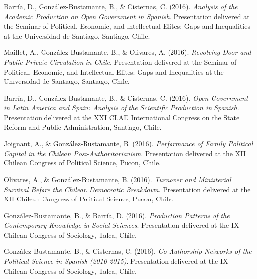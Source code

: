 \begin{publications}
\begin{benumerate}{66}
\item{\small Barría, D., González-Bustamante, B., \& Cisternas, C. (2016). {\itshape Analysis of the Academic Production on Open Government in Spanish}. Presentation delivered at the Seminar of Political, Economic, and Intellectual Elites: Gaps and Inequalities at the Universidad de Santiago, Santiago, Chile.}\vspace{1mm}

\item{\small Maillet, A., González-Bustamante, B., \& Olivares, A. (2016). {\itshape Revolving Door and Public-Private Circulation in Chile}. Presentation delivered at the Seminar of Political, Economic, and Intellectual Elites: Gaps and Inequalities at the Universidad de Santiago, Santiago, Chile.}\vspace{1mm}

\item{\small Barría, D., González-Bustamante, B., \& Cisternas, C. (2016). {\itshape Open Government in Latin America and Spain: Analysis of the Scientific Production in Spanish}. Presentation delivered at the XXI CLAD International Congress on the State Reform and Public Administration, Santiago, Chile.}\vspace{1mm}

\item{\small Joignant, A., \& González-Bustamante, B. (2016). {\itshape Performance of Family Political Capital in the Chilean Post-Authoritarianism}. Presentation delivered at the XII Chilean Congress of Political Science, Pucon, Chile.}\vspace{1mm}

\item{\small Olivares, A., \& González-Bustamante, B. (2016). {\itshape Turnover and Ministerial Survival Before the Chilean Democratic Breakdown}. Presentation delivered at the XII Chilean Congress of Political Science, Pucon, Chile.}\vspace{1mm}

\item{\small González-Bustamante, B., \& Barría, D. (2016). {\itshape Production Patterns of the Contemporary Knowledge in Social Sciences}. Presentation delivered at the IX Chilean Congress of Sociology, Talca, Chile.}\vspace{1mm}

\item{\small González-Bustamante, B., \& Cisternas, C. (2016). {\itshape Co-Authorship Networks of the Political Science in Spanish (2010-2015)}. Presentation delivered at the IX Chilean Congress of Sociology, Talca, Chile.}\vspace{1mm}


\end{benumerate}
\end{publications}
